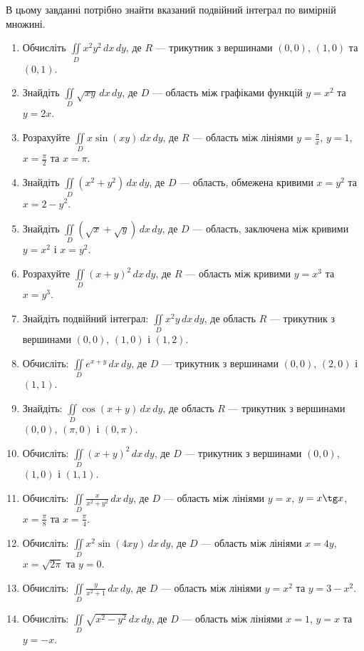 \item  В цьому завданні потрібно знайти вказаний подвійний інтеграл по вимірній множині.
\begin{enumerate}[label*=\arabic*.]
\item Обчисліть ${{\iint\limits_D x^2y^2 \,dx\,dy}}$, де ${{R}}$ --- трикутник з вершинами ${(0,0)}$, ${(1,0)}$ та ${(0,1)}$.
\item Знайдіть ${\iint\limits_D \sqrt{xy} \,dx\,dy}$, де ${D}$ --- область між графіками функцій ${y = x^2}$ та ${y = 2x}$.
\item Розрахуйте ${\iint\limits_D x\sin(xy) \,dx\,dy}$, де ${R}$ --- область між лініями ${y = \frac{\pi}{x}}$, ${y = 1}$, ${x = \frac{\pi}{2}}$ та ${x = \pi}$.
\item Знайдіть ${\iint\limits_D (x^2 + y^2) \,dx\,dy}$, де ${D}$ --- область, обмежена кривими ${x = y^2}$ та ${x = 2-y^2}$.
\item Знайдіть ${\iint\limits_D \left(\sqrt{x} + \sqrt{y}\right) \,dx\,dy}$, де ${D}$ --- область, заключена між кривими ${y = x^2}$ і ${x = y^2}$.
\item Розрахуйте ${\iint\limits_D  (x +y)^{2} \,dx\,dy}$, де ${R}$ --- область між кривими ${y = x^3}$ та ${x = y^3}$.
  \item Знайдіть подвійний інтеграл: $\iint\limits_D x^2y\,dx\,dy$, де область $R$ --- трикутник з вершинами $(0,0)$, $(1,0)$ і $(1,2)$.
  \item Обчисліть: $\iint\limits_D e^{x+y}\,dx\,dy$, де $D$ --- трикутник з вершинами $(0,0)$, $(2,0)$ і $(1,1)$.
  \item Знайдіть: $\iint\limits_D \cos(x+y)\,dx\,dy$, де область $R$ --- трикутник з вершинами $(0,0)$, $(\pi,0)$ і $(0,\pi)$.
  \item Обчисліть: $\iint\limits_D (x+y)^2\,dx\,dy$, де $D$ --- трикутник з вершинами $(0,0)$, $(1,0)$ і $(1,1)$.
  \item Обчисліть: $\iint\limits_D \frac{x}{x^2+y^2}\,dx\,dy$, де $D$ --- область між лініями ${y = x}$, ${y = x\tg x}$, ${x = \frac{\pi}{8}}$ та ${x = \frac{\pi}{4}}$.
  \item Обчисліть: $\iint\limits_D x^2\sin(4 x y)\,dx\,dy$, де $D$ --- область між лініями ${x = 4y}$, ${x = \sqrt{2\pi}}$ та ${y = 0}$.
  \item Обчисліть: $\iint\limits_D \frac{y}{x^2 + 1}\,dx\,dy$, де $D$ --- область між лініями ${y = x^2}$ та ${y = 3 - x^2}$.
  \item Обчисліть: $\iint\limits_D \sqrt{x^{2}-y^{2}}\,dx\,dy$, де $D$ --- область між лініями ${x = 1}$, ${y = x}$ та ${y = -x}$.

\end{enumerate}
